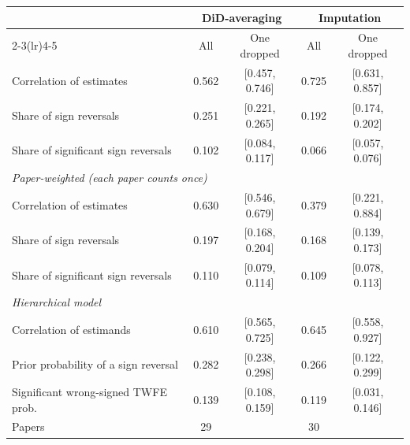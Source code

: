 \begin{tabular}{lcccc}
\toprule
 & \multicolumn{2}{c}{DiD-averaging} & \multicolumn{2}{c}{Imputation} \\
\cmidrule(lr){2-3}\cmidrule(lr){4-5}
 & All & One dropped & All & One dropped \\
\midrule
Correlation of estimates & 0.562 & [0.457, 0.746] & 0.725 & [0.631, 0.857] \\
Share of sign reversals & 0.251 & [0.221, 0.265] & 0.192 & [0.174, 0.202] \\
Share of significant sign reversals & 0.102 & [0.084, 0.117] & 0.066 & [0.057, 0.076] \\
\midrule
\multicolumn{5}{l}{\emph{Paper-weighted (each paper counts once)}} \\
Correlation of estimates & 0.630 & [0.546, 0.679] & 0.379 & [0.221, 0.884] \\
Share of sign reversals & 0.197 & [0.168, 0.204] & 0.168 & [0.139, 0.173] \\
Share of significant sign reversals & 0.110 & [0.079, 0.114] & 0.109 & [0.078, 0.113] \\
\midrule
\multicolumn{5}{l}{\emph{Hierarchical model}} \\
Correlation of estimands & 0.610 & [0.565, 0.725] & 0.645 & [0.558, 0.927] \\
Prior probability of a sign reversal & 0.282 & [0.238, 0.298] & 0.266 & [0.122, 0.299] \\
Significant wrong-signed TWFE prob. & 0.139 & [0.108, 0.159] & 0.119 & [0.031, 0.146] \\
\midrule
Papers & 29 & & 30 & \\
\bottomrule
\end{tabular}
